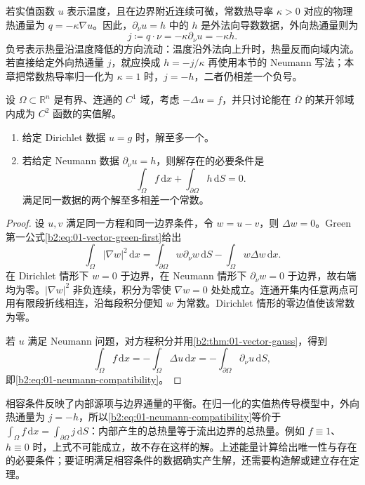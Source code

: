 \ProseParagraphBreak

若实值函数 \(u\) 表示温度，且在边界附近连续可微，常数热导率 \(\kappa>0\) 对应的物理热通量为 \(q=-\kappa\nabla u\)。因此，\(\partial_\nu u=h\) 中的 \(h\) 是外法向导数数据，外向热通量则为
\[
 j\coloneqq q\cdot\nu=-\kappa\partial_\nu u=-\kappa h.
\]
负号表示热量沿温度降低的方向流动：温度沿外法向上升时，热量反而向域内流。若直接给定外向热通量 \(j\)，就应换成 \(h=-j/\kappa\) 再使用本节的 Neumann 写法；本章把常数热导率归一化为 \(\kappa=1\) 时，\(j=-h\)，二者仍相差一个负号。

\begin{proposition}\label{b2:prop:01-poisson-boundary}
设 \(\Omega\subset\mathbb R^n\) 是有界、连通的 \(C^1\) 域，考虑 \(-\Delta u=f\)，并只讨论能在 \(\overline\Omega\) 的某开邻域内成为 \(C^2\) 函数的实值解。
\begin{enumerate}
\item\label{b2:item:01-dirichlet-unique}给定 Dirichlet 数据 \(u=g\) 时，解至多一个。
\item\label{b2:item:01-neumann-compatible}若给定 Neumann 数据 \(\partial_\nu u=h\)，则解存在的必要条件是
\begin{equation}\label{b2:eq:01-neumann-compatibility}
\int_\Omega f\,\mathrm{d}x+\int_{\partial\Omega}h\,\mathrm{d}S=0.
\end{equation}
满足同一数据的两个解至多相差一个常数。
\end{enumerate}
\end{proposition}
\begin{proof}
设 \(u,v\) 满足同一方程和同一边界条件，令 \(w=u-v\)，则 \(\Delta w=0\)。Green 第一公式\eqref{b2:eq:01-vector-green-first}给出
\[
\int_\Omega|\nabla w|^2\,\mathrm{d}x
=\int_{\partial\Omega}w\partial_\nu w\,\mathrm{d}S
-\int_\Omega w\Delta w\,\mathrm{d}x.
\]
在 Dirichlet 情形下 \(w=0\) 于边界，在 Neumann 情形下 \(\partial_\nu w=0\) 于边界，故右端均为零。\(|\nabla w|^2\) 非负连续，积分为零使 \(\nabla w=0\) 处处成立。连通开集内任意两点可用有限段折线相连，沿每段积分便知 \(w\) 为常数。Dirichlet 情形的零边值使该常数为零。

若 \(u\) 满足 Neumann 问题，对方程积分并用\cref{b2:thm:01-vector-gauss}，得到
\[
\int_\Omega f\,\mathrm{d}x=-\int_\Omega\Delta u\,\mathrm{d}x
=-\int_{\partial\Omega}\partial_\nu u\,\mathrm{d}S,
\]
即\eqref{b2:eq:01-neumann-compatibility}。
\end{proof}

相容条件反映了内部源项与边界通量的平衡。在归一化的实值热传导模型中，外向热通量为 \(j=-h\)，所以\eqref{b2:eq:01-neumann-compatibility}等价于 \(\int_\Omega f\,\mathrm dx=\int_{\partial\Omega}j\,\mathrm dS\)：内部产生的总热量等于流出边界的总热量。例如 \(f\equiv1\)、\(h\equiv0\) 时，上式不可能成立，故不存在这样的解。上述能量计算给出唯一性与存在的必要条件；要证明满足相容条件的数据确实产生解，还需要构造解或建立存在定理。

